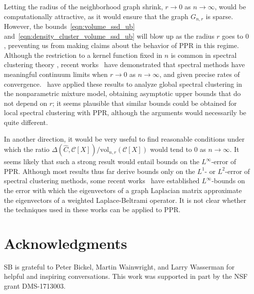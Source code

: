 \documentclass[11pt,twoside]{article}
\newcommand{\1}{\mathbf{1}}
\newcommand{\Leb}{L}
\newcommand{\mc}[1]{\mathcal{#1}}
\newcommand{\wh}[1]{\widehat{#1}}
\newcommand{\vol}{\mathrm{vol}}
\begin{document}
Letting the radius of the neighborhood graph shrink, $r \to 0$ as $n \to  
\infty$, would be computationally attractive, as it would ensure that the graph 
$G_{n,r}$ is sparse. However, the bounds~\eqref{eqn:volume_ssd_ub} and~\eqref{eqn:density_cluster_volume_ssd_ub} will blow up as the radius $r$ goes to $0$, preventing us from making claims about the behavior of PPR in
this regime. Although the restriction to a kernel function fixed in $n$ is
common in spectral clustering theory \citep{vonluxburg2008, schiebinger2015, singer2017},
recent works~\citep{shi2015, calder2019, garciatrillos18, garciatrillos2020, yuan2020} have demonstrated that spectral methods have meaningful continuum limits when $r \to 0$ as $n \to \infty$, and given precise rates of convergence.~\cite{garciatrillos19} have applied these results to analyze global spectral clustering in the nonparametric mixture model, obtaining asymptotic upper bounds that do not depend on $r$; it seems plausible that similar bounds could be obtained for local spectral clustering with PPR, although the arguments would necessarily be quite different.

In another direction, it would be very useful to find reasonable conditions under which the ratio $\Delta(\wh{C},\mc{C}[X])/\vol_{n,r}(\mc{C}[X])$ would tend to $0$ as $n \to \infty$. It seems likely that such a strong result would entail bounds on the $\Leb^{\infty}$-error of PPR. Although most results thus far derive bounds only on the $\Leb^1$- or $\Leb^2$-error of spectral clustering methods, some recent works~\citep{dunson2020,calder2020} have established $\Leb^{\infty}$-bounds on the error with which the eigenvectors of a graph Laplacian matrix approximate the eigenvectors of a weighted Laplace-Beltrami operator. It is not clear whether the techniques used in these works can be applied to PPR.

\section*{Acknowledgments}

SB is grateful to Peter Bickel, Martin Wainwright, and Larry Wasserman for
helpful and inspiring conversations. This work was supported in part by the NSF grant DMS-1713003.

 

\clearpage

\appendix

\end{document}
